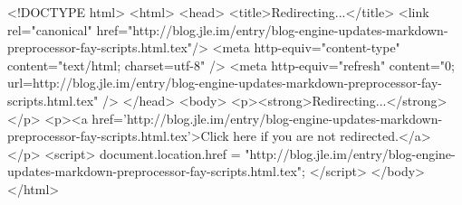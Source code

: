 <!DOCTYPE html>
<html>
<head>
<title>Redirecting...</title>
<link rel="canonical" href="http://blog.jle.im/entry/blog-engine-updates-markdown-preprocessor-fay-scripts.html.tex"/>
<meta http-equiv="content-type" content="text/html; charset=utf-8" />
<meta http-equiv="refresh" content="0; url=http://blog.jle.im/entry/blog-engine-updates-markdown-preprocessor-fay-scripts.html.tex" />
</head>
<body>
  <p><strong>Redirecting...</strong></p>
  <p><a href='http://blog.jle.im/entry/blog-engine-updates-markdown-preprocessor-fay-scripts.html.tex'>Click here if you are not redirected.</a></p>
  <script>
    document.location.href = "http://blog.jle.im/entry/blog-engine-updates-markdown-preprocessor-fay-scripts.html.tex";
  </script>
</body>
</html>
